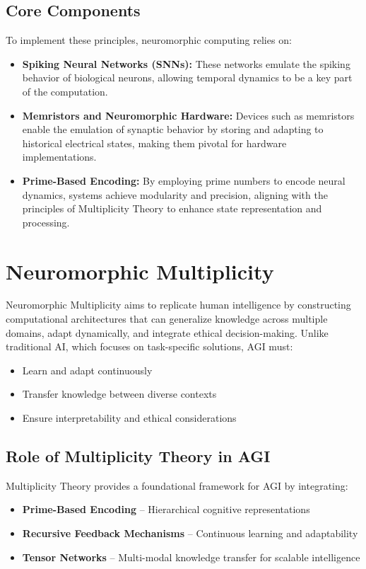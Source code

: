 \documentclass{article}
\theoremstyle{plain}
\begin{document}
\begin{itemize}
\begin{itemize}
\subsection{Core Components}
To implement these principles, neuromorphic computing relies on:
\begin{itemize}
    \item \textbf{Spiking Neural Networks (SNNs):} These networks emulate the spiking behavior of biological neurons, allowing temporal dynamics to be a key part of the computation.
    \item \textbf{Memristors and Neuromorphic Hardware:} Devices such as memristors enable the emulation of synaptic behavior by storing and adapting to historical electrical states, making them pivotal for hardware implementations.
    \item \textbf{Prime-Based Encoding:} By employing prime numbers to encode neural dynamics, systems achieve modularity and precision, aligning with the principles of Multiplicity Theory to enhance state representation and processing.
\end{itemize}

\section{Neuromorphic Multiplicity}
Neuromorphic Multiplicity aims to replicate human intelligence by constructing computational architectures that can generalize knowledge across multiple domains, adapt dynamically, and integrate ethical decision-making. Unlike traditional AI, which focuses on task-specific solutions, AGI must:
\begin{itemize}
    \item Learn and adapt continuously
    \item Transfer knowledge between diverse contexts
    \item Ensure interpretability and ethical considerations
\end{itemize}

\subsection{Role of Multiplicity Theory in AGI}
Multiplicity Theory provides a foundational framework for AGI by integrating:
\begin{itemize}
    \item \textbf{Prime-Based Encoding} -- Hierarchical cognitive representations
    \item \textbf{Recursive Feedback Mechanisms} -- Continuous learning and adaptability
    \item \textbf{Tensor Networks} -- Multi-modal knowledge transfer for scalable intelligence
\end{itemize}

\end{itemize}
\end{itemize}
\end{document}

